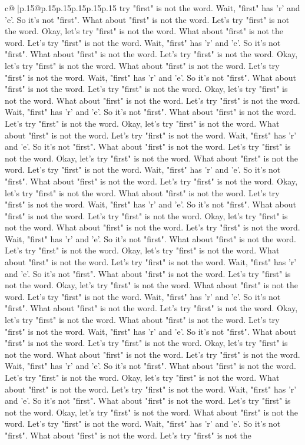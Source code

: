 \documentclass{article}
\begin{document}
{\begin{supertabular}{c@{$\;$}|p{.15\linewidth}@{}p{.15\linewidth}p{.15\linewidth}p{.15\linewidth}p{.15\linewidth}p{.15\linewidth}}
{{{try "first" is not the word. Wait, "first" has 'r' and 'e'. So it's not "first". What about "first" is not the word. Let's try "first" is not the word. Okay, let's try "first" is not the word. What about "first" is not the word. Let's try "first" is not the word. Wait, "first" has 'r' and 'e'. So it's not "first". What about "first" is not the word. Let's try "first" is not the word. Okay, let's try "first" is not the word. What about "first" is not the word. Let's try "first" is not the word. Wait, "first" has 'r' and 'e'. So it's not "first". What about "first" is not the word. Let's try "first" is not the word. Okay, let's try "first" is not the word. What about "first" is not the word. Let's try "first" is not the word. Wait, "first" has 'r' and 'e'. So it's not "first". What about "first" is not the word. Let's try "first" is not the word. Okay, let's try "first" is not the word. What about "first" is not the word. Let's try "first" is not the word. Wait, "first" has 'r' and 'e'. So it's not "first". What about "first" is not the word. Let's try "first" is not the word. Okay, let's try "first" is not the word. What about "first" is not the word. Let's try "first" is not the word. Wait, "first" has 'r' and 'e'. So it's not "first". What about "first" is not the word. Let's try "first" is not the word. Okay, let's try "first" is not the word. What about "first" is not the word. Let's try "first" is not the word. Wait, "first" has 'r' and 'e'. So it's not "first". What about "first" is not the word. Let's try "first" is not the word. Okay, let's try "first" is not the word. What about "first" is not the word. Let's try "first" is not the word. Wait, "first" has 'r' and 'e'. So it's not "first". What about "first" is not the word. Let's try "first" is not the word. Okay, let's try "first" is not the word. What about "first" is not the word. Let's try "first" is not the word. Wait, "first" has 'r' and 'e'. So it's not "first". What about "first" is not the word. Let's try "first" is not the word. Okay, let's try "first" is not the word. What about "first" is not the word. Let's try "first" is not the word. Wait, "first" has 'r' and 'e'. So it's not "first". What about "first" is not the word. Let's try "first" is not the word. Okay, let's try "first" is not the word. What about "first" is not the word. Let's try "first" is not the word. Wait, "first" has 'r' and 'e'. So it's not "first". What about "first" is not the word. Let's try "first" is not the word. Okay, let's try "first" is not the word. What about "first" is not the word. Let's try "first" is not the word. Wait, "first" has 'r' and 'e'. So it's not "first". What about "first" is not the word. Let's try "first" is not the word. Okay, let's try "first" is not the word. What about "first" is not the word. Let's try "first" is not the word. Wait, "first" has 'r' and 'e'. So it's not "first". What about "first" is not the word. Let's try "first" is not the word. Okay, let's try "first" is not the word. What about "first" is not the word. Let's try "first" is not the word. Wait, "first" has 'r' and 'e'. So it's not "first". What about "first" is not the word. Let's try "first" is not the }}}
\end{supertabular}}
\end{document}

